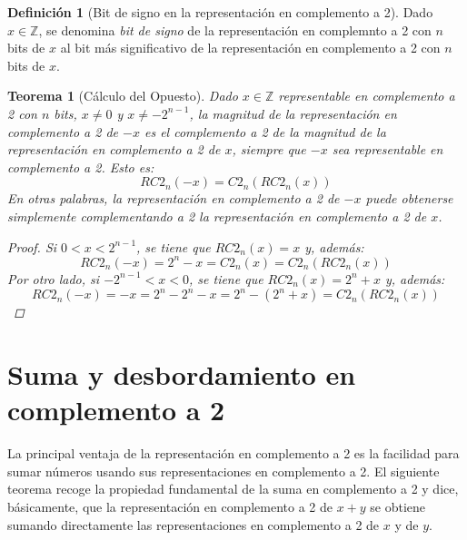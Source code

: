 \documentclass[spanish,a4paper,12pt,titlepage]{article}
\newtheorem{theorem}{Teorema}%
\theoremstyle{definition}
\newtheorem{definition}{Definición}%
\theoremstyle{remark}
\newcommand{\bbZ}{\mathbb{Z}}
\begin{document}
\begin{definition}[Bit de signo en la representación en complemento a 2]
  Dado $x \in \bbZ$, se denomina \emph{bit de signo} de la representación en complemnto a 2 con $n$ bits de $x$ al bit más significativo de la representación en complemento a 2 con $n$ bits de $x$.
\end{definition}

\begin{theorem}[Cálculo del Opuesto]
  Dado $x \in \bbZ$ representable en complemento a 2 con $n$ bits, $x \ne 0$ y $x \ne -2^{n-1}$, la magnitud de la representación en complemento a 2 de $-x$ es el complemento a 2 de la magnitud de la representación en complemento a 2 de $x$, siempre que $-x$ sea representable en complemento a 2. Esto es:
  \[RC2_n(-x) = C2_n(RC2_n(x))\]
  En otras palabras, la representación en complemento a 2 de $-x$ puede obtenerse simplemente complementando a 2 la representación en complemento a 2 de $x$.

  \begin{proof}
    Si $0<x<2^{n-1}$, se tiene que $RC2_n(x)=x$ y, además:
    \[
      RC2_n(-x) = 2^n - x = C2_n(x) = C2_n(RC2_n(x))
    \]
    Por otro lado, si $-2^{n-1}<x<0$, se tiene que $RC2_n(x)=2^n+x$ y, además:
    \[
      RC2_n(-x) = -x = 2^n - 2^n - x = 2^n - (2^n+x) = C2_n(RC2_n(x))
    \]
  \end{proof}
\end{theorem}

\section{Suma y desbordamiento en complemento a 2}

La principal ventaja de la representación en complemento a 2 es la facilidad para sumar números usando sus representaciones en complemento a 2. El siguiente teorema recoge la propiedad fundamental de la suma en complemento a 2 y dice, básicamente, que la representación en complemento a 2 de $x+y$ se obtiene sumando directamente las representaciones en complemento a 2 de $x$ y de $y$.
\end{document}
